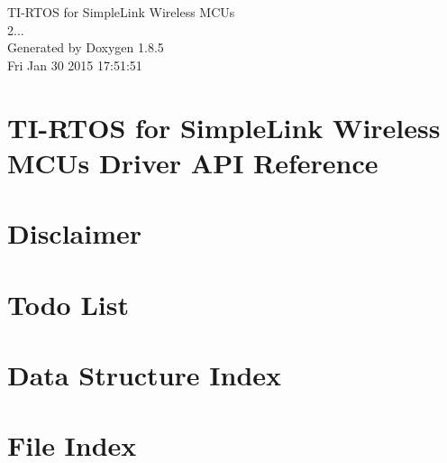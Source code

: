 \documentclass[twoside]{article}
\begin{document}
\begin{titlepage}
\vspace*{7cm}
\begin{center}%
{\Large T\-I-\/\-R\-T\-O\-S for Simple\-Link Wireless M\-C\-Us \\[1ex]\large 2... }\\
\vspace*{1cm}
{\large Generated by Doxygen 1.8.5}\\
\vspace*{0.5cm}
{\small Fri Jan 30 2015 17:51:51}\\
\end{center}
\end{titlepage}
\tableofcontents
{}

\section{T\-I-\/\-R\-T\-O\-S for Simple\-Link Wireless M\-C\-Us Driver A\-P\-I Reference}
\label{index}\hypertarget{index}{}
\section{Disclaimer}
\label{_disclaimer}

\section{Todo List}
\label{todo}

\section{Data Structure Index}

\section{File Index}

\end{document}
